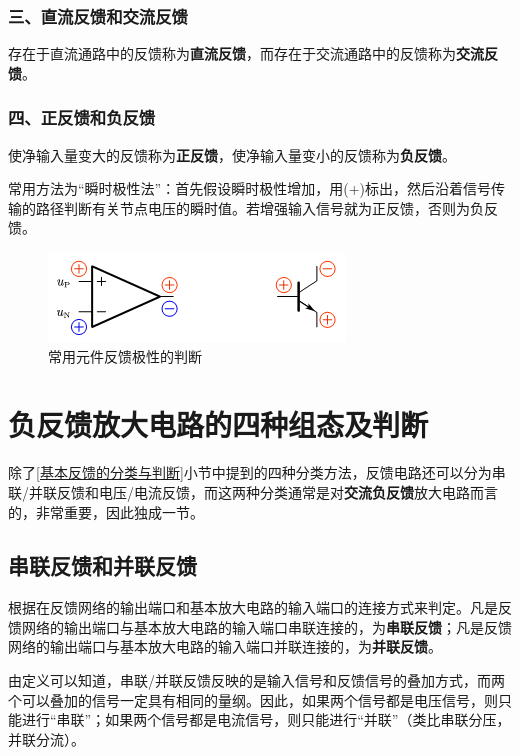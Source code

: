 \subsubsection{三、直流反馈和交流反馈}
存在于直流通路中的反馈称为\textbf{直流反馈}，而存在于交流通路中的反馈称为\textbf{交流反馈}。

\subsubsection{四、正反馈和负反馈}
使净输入量变大的反馈称为\textbf{正反馈}，使净输入量变小的反馈称为\textbf{负反馈}。

常用方法为“瞬时极性法”：首先假设瞬时极性增加，用(+)标出，然后沿着信号传输的路径判断有关节点电压的瞬时值。若增强输入信号就为正反馈，否则为负反馈。

\begin{figure}[htb]
    \centering
    \includegraphics[width=0.5\linewidth]{pic/反馈极性的判断.png}
    \caption{常用元件反馈极性的判断\label{反馈极性的判断}}
\end{figure}

\section{负反馈放大电路的四种组态及判断}
除了\ref{基本反馈的分类与判断}小节中提到的四种分类方法，反馈电路还可以分为串联/并联反馈和电压/电流反馈，而这两种分类通常是对\textbf{交流负反馈}放大电路而言的，非常重要，因此独成一节。

\subsection{串联反馈和并联反馈}
根据在反馈网络的输出端口和基本放大电路的输入端口的连接方式来判定。凡是反馈网络的输出端口与基本放大电路的输入端口串联连接的，为\textbf{串联反馈}；凡是反馈网络的输出端口与基本放大电路的输入端口并联连接的，为\textbf{并联反馈}。

由定义可以知道，串联/并联反馈反映的是输入信号和反馈信号的叠加方式，而两个可以叠加的信号一定具有相同的量纲。因此，如果两个信号都是电压信号，则只能进行“串联”；如果两个信号都是电流信号，则只能进行“并联”（类比串联分压，并联分流）。

